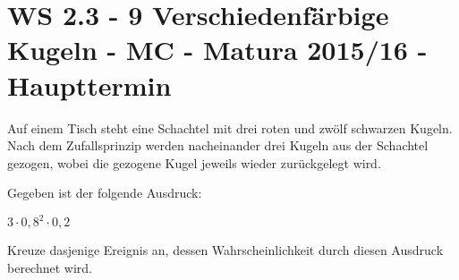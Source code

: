\section{WS 2.3 - 9 Verschiedenfärbige Kugeln - MC - Matura 2015/16 - Haupttermin}

\begin{beispiel}[WS 2.3]{1} %
Auf einem Tisch steht eine Schachtel mit drei roten und zwölf schwarzen Kugeln. Nach dem
Zufallsprinzip werden nacheinander drei Kugeln aus der Schachtel gezogen, wobei die gezogene
Kugel jeweils wieder zurückgelegt wird. \leer

Gegeben ist der folgende Ausdruck:

$3\cdot 0,8^2 \cdot 0,2$ \leer

Kreuze dasjenige Ereignis an, dessen Wahrscheinlichkeit durch diesen Ausdruck berechnet
wird.


\end{beispiel}